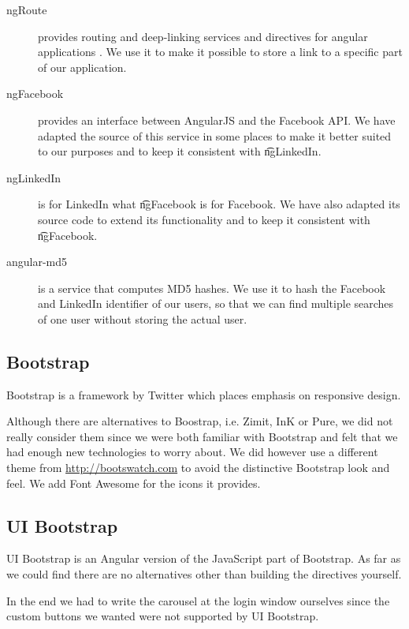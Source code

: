 			\begin{description}
				\item[ngRoute] provides routing and deep-linking services and directives for angular applications \cite{angulardocsngRoute}. We use it to make it possible to store a link to a specific part of our application. 
				\item[ngFacebook] provides an interface between AngularJS and the Facebook API. We have adapted the source of this service in some places to make it better suited to our purposes and to keep it consistent with \t{ngLinkedIn}.
				\item[ngLinkedIn] is for LinkedIn what \t{ngFacebook} is for Facebook. We have also adapted its source code to extend its functionality and to keep it consistent with \t{ngFacebook}.
				\item[angular-md5] is a service that computes MD5 hashes. We use it to hash the Facebook and LinkedIn identifier of our users, so that we can find multiple searches of one user without storing the actual user. 
			\end{description}

	\subsection{Bootstrap}
	\label{ssec:1:bootstrap}
		Bootstrap is a framework by Twitter which places emphasis on responsive design. 

		Although there are alternatives to Boostrap, i.e. Zimit, InK or Pure, we did not really consider them since we were both familiar with Bootstrap and felt that we had enough new technologies to worry about. We did however use a different theme from \url{http://bootswatch.com} to avoid the distinctive Bootstrap look and feel. We add Font Awesome for the icons it provides. 

	\subsection{UI Bootstrap}
	\label{ssec:1:bootstrapUI}
		UI Bootstrap is an Angular version of the JavaScript part of Bootstrap. As far as we could find there are no alternatives other than building the directives yourself. 

		In the end we had to write the carousel at the login window ourselves since the custom buttons we wanted were not supported by UI Bootstrap. 

